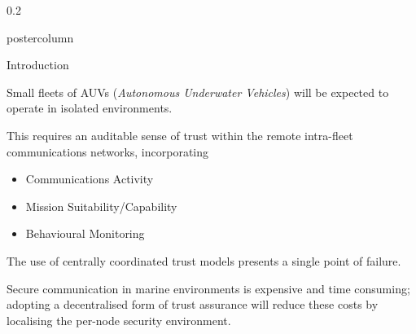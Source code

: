 \documentclass[final,hyperref={pdfpagelabels=false}]{beamer}
\def\colwidth{0.2\linewidth}
\begin{document}
\begin{frame}[fragile]
\begin{columns}[T]
\begin{column}{\colwidth}
\begin{beamercolorbox}[center,wd=\textwidth]{postercolumn}
\begin{minipage}[T]{.98\textwidth}
{\begin{block}{Introduction}
							\vspace{0.3\baselineskip}
							
							Small fleets of AUVs (\emph{Autonomous Underwater Vehicles}) will be expected to operate in isolated environments.
							\vspace{0.3\baselineskip}
							
							This requires an auditable sense of trust within the remote intra-fleet communications networks, incorporating
							\begin{itemize}
								\item Communications Activity
								\item Mission Suitability/Capability
								\item Behavioural Monitoring
							\end{itemize}
							
							\vspace{0.3\baselineskip}
							
							The use of centrally coordinated trust models presents a single point of failure.
							
							\vspace{0.3\baselineskip}
							
							Secure communication in marine environments is expensive and time consuming; adopting a decentralised form of trust assurance will reduce these costs by localising the per-node security environment.
							

\end{block}}
\end{minipage}
\end{beamercolorbox}
\end{column}
\end{columns}
\end{frame}
\end{document}
